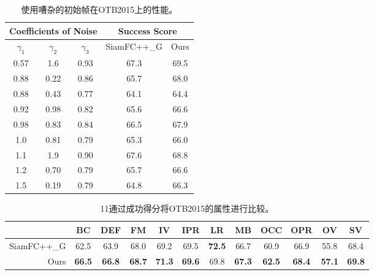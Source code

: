 \begin{table}[t]
\renewcommand\arraystretch{0.7}
\centering
\caption{使用嘈杂的初始帧在OTB2015上的性能。}
\begin{tabular}{c c c | c c}
\toprule
\multicolumn{3}{c|}{Coefficients of Noise} & \multicolumn{2}{c}{Success Score} \\
\midrule
$\gamma_1$ & $\gamma_2$ & $\gamma_3$  & SiamFC++\_G & Ours  \\
\midrule
0.57  &	1.6	 & 0.93	& 67.3    & 69.5 \\
0.88  & 0.22 & 0.86 & 65.7    & 68.0 \\
0.88  & 0.43 & 0.77 & 64.1    & 64.4 \\
0.92  & 0.98 & 0.82 & 65.6    & 66.6 \\
0.98  & 0.83 & 0.84 & 66.5    & 67.9 \\
1.0   & 0.81 & 0.79 & 65.3    & 66.0 \\
1.1   &	1.9  & 0.90	& 67.6    & 68.8 \\
1.2   & 0.70 & 0.79 & 65.7    & 66.6 \\
1.5   & 0.19 & 0.79 & 64.8    & 66.3 \\
\bottomrule
\end{tabular}
\label{table:noise}
\end{table}

\begin{table}[t]
\renewcommand\arraystretch{0.8}
\centering
\setlength{\tabcolsep}{2pt}
\caption{11通过成功得分将OTB2015的属性进行比较。}
\begin{tabular}{r c c c c c c c c c c c}
\toprule
            & BC & DEF & FM            & IV            & IPR           & LR    & MB    & OCC   & OPR   & OV    & SV    \\
\midrule
SiamFC++\_G  &  62.5 & 63.9 & 68.0          & 69.2          & 69.5          & \textbf{72.5}  & 66.7 & 60.9 & 66.9 & 55.8 & 68.4 \\
Ours        & \textbf{66.5} & \textbf{66.8} & \textbf{68.7} & \textbf{71.3} & \textbf{69.6} & 69.8  & \textbf{67.3} & \textbf{62.5} & \textbf{68.4} & \textbf{57.1} & \textbf{69.8} \\
\bottomrule
\end{tabular}
\label{table:attr}
\end{table}

